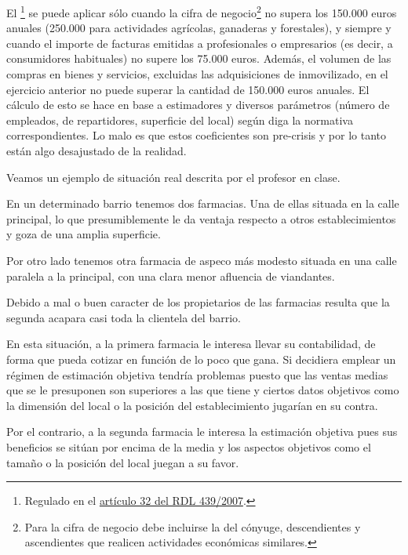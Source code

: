 \documentclass[nochap,palatino,shortheader]{apuntes}
\begin{document}
El \footnote{Regulado en el \href{https://www.boe.es/buscar/act.php?id=BOE-A-2007-6820}{artículo 32 del RDL 439/2007}.} se puede aplicar sólo cuando la cifra de negocio\footnote{Para la cifra de negocio debe incluirse la del cónyuge, descendientes y ascendientes que realicen actividades económicas similares.} no supera los 150.000 euros anuales (250.000 para actividades agrícolas, ganaderas y forestales), y siempre y cuando el importe de facturas emitidas a profesionales o empresarios (es decir, a consumidores habituales) no supere los 75.000 euros. Además, el volumen de las compras en bienes y servicios, excluidas las adquisiciones de inmovilizado, en el ejercicio anterior no puede superar la cantidad de 150.000 euros anuales. El cálculo de esto se hace en base a estimadores y diversos parámetros (número de empleados, de repartidores, superficie del local) según diga la normativa correspondientes. Lo malo es que estos coeficientes son pre-crisis y por lo tanto están algo desajustado de la realidad.%

\begin{example}
Veamos un ejemplo de situación real descrita por el profesor en clase.

En un determinado barrio tenemos dos farmacias. Una de ellas situada en la calle principal, lo que presumiblemente le da ventaja respecto a otros establecimientos y goza de una amplia superficie.

Por otro lado tenemos otra farmacia de aspeco más modesto situada en una calle paralela a la principal, con una clara menor afluencia de viandantes.

Debido a mal o buen caracter de los propietarios de las farmacias resulta que la segunda acapara casi toda la clientela del barrio.

En esta situación, a la primera farmacia le interesa llevar su contabilidad, de forma que pueda cotizar en función de lo poco que gana. Si decidiera emplear un régimen de estimación objetiva tendría problemas puesto que las ventas medias que se le presuponen son superiores a las que tiene y ciertos datos objetivos como la dimensión del local o la posición del establecimiento jugarían en su contra.

Por el contrario, a la segunda farmacia le interesa la estimación objetiva pues sus beneficios se sitúan por encima de la media y los aspectos objetivos como el tamaño o la posición del local juegan a su favor.
\end{example}
\end{document}

